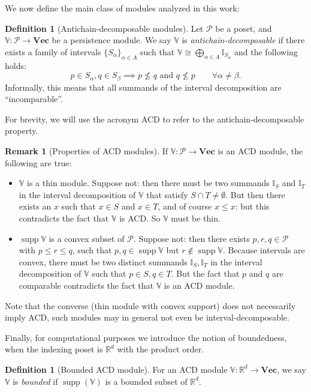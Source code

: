 \documentclass[a4paper,UKenglish,thm-restate]{article}
\theoremstyle{definition}
\newtheorem{definition}[theorem]{Definition}
\newtheorem{remark}[theorem]{Remark}
\def\bbv{\mathbb{V}}
\def\bvec{\mathbf{Vec}}
\DeclareMathOperator{\supp}{supp}
\begin{document}
    We now define the main class of modules analyzed in this work:
    \begin{definition}[Antichain-decomposable modules] \label{def:acdmodules}
        Let $\mathcal{P}$ be a poset, and $\bbv: \mathcal{P} \rightarrow \bvec$ be a persistence module. We say $\bbv$ is \emph{antichain-decomposable} if there exists a family of intervals $\{S_\alpha\}_{\alpha \in A}$ such that $\bbv \cong \bigoplus_{\alpha \in A} \mathbb{I}_{S_\alpha}$ and the following holds:
        \[ p \in S_\alpha, q \in S_\beta \implies p \not \leq q \text{ and } q \not \leq p \qquad \forall \alpha \neq \beta. \]
        Informally, this means that all summands of the interval decomposition are ``incomparable''.
    \end{definition}
    For brevity, we will use the acronym ACD to refer to the antichain-decomposable property. 
    \begin{remark}[Properties of ACD modules] \label{rem:acdproperties}
        If $\bbv: \mathcal{P} \rightarrow \bvec$ is an ACD module, the following are true:
        \begin{itemize}
            \item $\bbv$ is a thin module. Suppose not: then there must be two summands $\mathbb{I}_S$ and $\mathbb{I}_T$ in the interval decomposition of $\bbv$ that satisfy $S \cap T \neq \emptyset$. But then there exists an $x$ such that $x \in S$ and $x \in T$, and of course $x \leq x$: but this contradicts the fact that $\bbv$ is ACD. So $\bbv$ must be thin.
            \item $\supp \bbv$ is a convex subset of $\mathcal{P}$. Suppose not: then there exists $p, r, q \in \mathcal{P}$ with $p \leq r \leq q$, such that $p, q \in \supp \bbv$ but $r \notin \supp \bbv$. Because intervals are convex, there must be two distinct summands $\mathbb{I}_S, \mathbb{I}_T$ in the interval decomposition of $\bbv$ such that $p \in S, q \in T$. But the fact that $p$ and $q$ are comparable contradicts the fact that $\bbv$ is an ACD module.
        \end{itemize}
        Note that the converse (thin module with convex support) does not necessarily imply ACD, such modules may in general not even be interval-decomposable.
    \end{remark}
    
    Finally, for computational purposes we introduce the notion of boundedness, when the indexing poset is $\mathbb{R}^d$ with the product order.
    \begin{definition}[Bounded ACD module] \label{def:boundedacdmodule}
        For an ACD module $\bbv: \mathbb{R}^d \rightarrow \bvec$, we say $\bbv$ is \emph{bounded} if $\supp(\bbv)$ is a bounded subset of $\mathbb{R}^d$.
    \end{definition}
\end{document}
